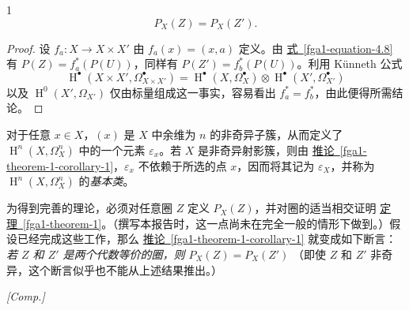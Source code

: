 \begin{corollary}{1}
\[       P_X(Z) = P_X(Z').     \]\begin{proof}\par{}设 \(f_a\colon  X\to  X\times  X'\) 由 \(f_a(x)=(x,a)\) 定义。由 \hyperref[fga1-equation-4.8]{式~\ref*{fga1-equation-4.8}} 有 \(P(Z)=f_a^*(P(U))\)，同样有 \(P(Z')=f_b^*(P(U))\)。利用 Künneth 公式
\[         \operatorname {H}^\bullet (X\times  X',\Omega _{X\times  X'}^\bullet )         = \operatorname {H}^\bullet (X,\Omega _X^\bullet )\otimes \operatorname {H}^\bullet (X',\Omega _{X'}^\bullet )       \]
以及 \(\operatorname {H}^0(X',\Omega _{X'})\) 仅由标量组成这一事实，容易看出 \(f_a^*=f_b^*\)，由此便得所需结论。\end{proof}\end{corollary}\par{}对于任意 \(x\in  X\)，\((x)\) 是 \(X\) 中余维为 \(n\) 的非奇异子簇，从而定义了 \(\operatorname {H}^n(X,\Omega _X^n)\) 中的一个元素 \(\varepsilon _x\)。若 \(X\) 是非奇异射影簇，则由 \hyperref[fga1-theorem-1-corollary-1]{推论~\ref*{fga1-theorem-1-corollary-1}}，\(\varepsilon _x\) 不依赖于所选的点 \(x\)，因而将其记为 \(\varepsilon _X\)，并称为 \(\operatorname {H}^n(X,\Omega _X^n)\) 的\emph{基本类}。\begin{remark}{}\label{fga1-4-remark-i}\skipsinglepar\par{}为得到完善的理论，必须对任意圈 \(Z\) 定义 \(P_X(Z)\)，并对圈的适当相交证明 \hyperref[fga1-theorem-1]{定理~\ref*{fga1-theorem-1}}。（撰写本报告时，这一点尚未在完全一般的情形下做到。）假设已经完成这些工作，那么 \hyperref[fga1-theorem-1-corollary-1]{推论~\ref*{fga1-theorem-1-corollary-1}} 就变成如下断言：
\emph{若 \(Z\) 和 \(Z'\) 是两个代数等价的圈，则 \(P_X(Z)=P_X(Z')\)}
（即使 \(Z\) 和 \(Z'\) 非奇异，这个断言似乎也不能从上述结果推出。）\end{remark}\begin{remark}{}\label{fga1-4-remark-ii}\skipsinglepar\par{}\emph{[Comp.]}

\end{remark}
